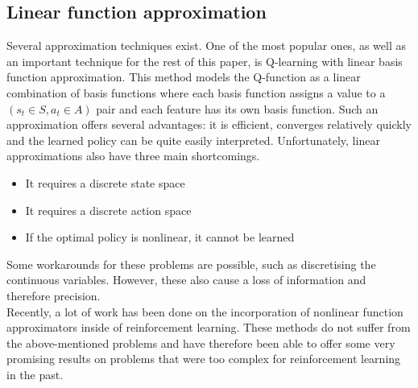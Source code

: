 \subsection{Linear function approximation}
Several approximation techniques exist. One of the most popular ones, as well as an important technique for the rest of this paper,  is Q-learning with linear basis function approximation. This method models the Q-function as a linear combination of basis functions where each basis function assigns a value to a $(s_t \in S,a_t \in A)$ pair and each feature has its own basis function. Such an approximation offers several advantages: it is efficient, converges relatively quickly and the learned policy can be quite easily interpreted. Unfortunately, linear approximations also have three main shortcomings.
\begin{itemize}
    \item It requires a discrete state space
    \item It requires a discrete action space
    \item If the optimal policy is nonlinear, it cannot be learned
\end{itemize}
Some workarounds for these problems are possible, such as discretising the continuous variables. However, these also cause a loss of information and therefore precision.\\
Recently, a lot of work has been done on the incorporation of nonlinear function approximators inside of reinforcement learning. These methods do not suffer from the above-mentioned problems and have therefore been able to offer some very promising results on problems that were too complex for reinforcement learning in the past.
